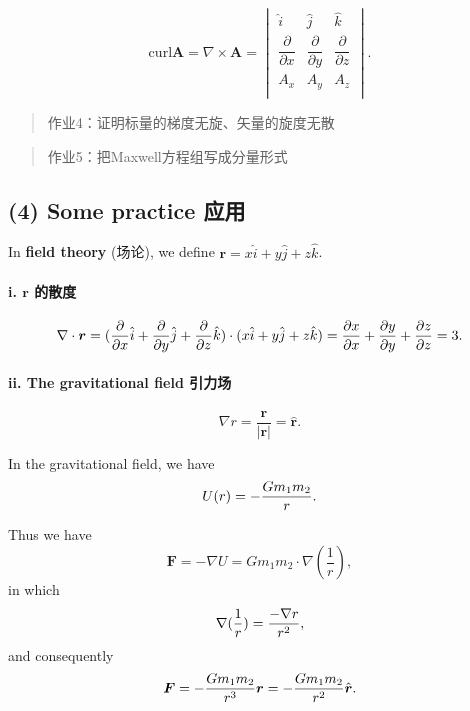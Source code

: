 \[\mathrm{curl} \boldsymbol A = \nabla \times \boldsymbol A = \begin{vmatrix}
    \hat i & \hat j & \hat k \\
    \dfrac{\partial}{\partial x} & \dfrac{\partial}{\partial y} & \dfrac{\partial}{\partial z} \\
    A_x & A_y & A_z \\
\end{vmatrix}.\]

\begin{quote}
作业4：证明标量的梯度无旋、矢量的旋度无散
\end{quote}

\begin{quote}
作业5：把Maxwell方程组写成分量形式
\end{quote}

\subsection*{(4) Some practice 应用}\label{some-practice-ux5e94ux7528}

In \textbf{field theory} (场论), we define \(\boldsymbol r = x \hat i + y \hat j + z \hat k\).

\paragraph{i. \(\boldsymbol r\) 的散度}\label{boldsymbol-r-ux7684ux6563ux5ea6}

\[\nabla \cdot \boldsymbol r = ({\partial \over \partial x}\hat i + {\partial \over \partial y}\hat j + {\partial \over \partial z}\hat k) \cdot (x \hat i + y \hat j + z \hat k) = {\partial x \over \partial x} + {\partial y \over \partial y} + {\partial z \over \partial z} =3.\]

\paragraph{ii. The gravitational field 引力场}\label{the-gravitational-field-ux5f15ux529bux573a}

\[\nabla r = \dfrac{\boldsymbol r}{|\boldsymbol r|} = \hat{\boldsymbol r}.\]

In the gravitational field, we have \[U(r) = -{Gm_1m_2 \over r}.\]

Thus we have \[\boldsymbol F = -\nabla U = Gm_1m_2 \cdot \nabla(\dfrac{1}{r}), \] in which \[\nabla(\dfrac{1}{r})={-\nabla r \over r^2}, \] and consequently \[\boldsymbol F = - {G m_1 m_2 \over r^3}\boldsymbol r = - {G m_1 m_2 \over r^2} \hat {\boldsymbol r}.\]

